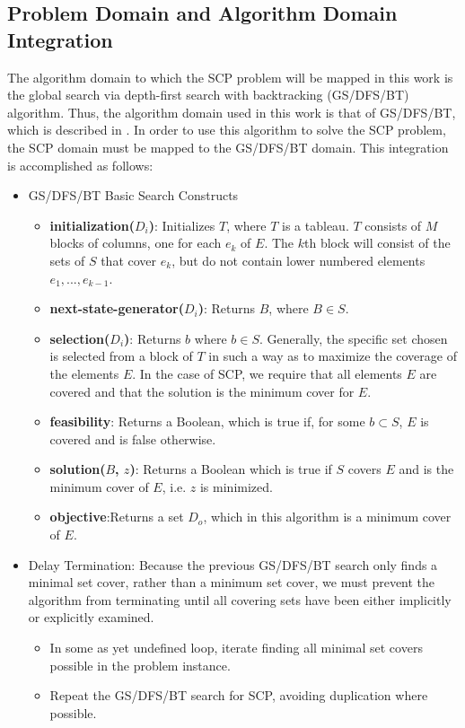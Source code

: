 \documentclass[12pt]{article}
\begin{document}
\subsection{Problem Domain and Algorithm Domain Integration}

The algorithm domain to which the SCP problem will be mapped in this work is the global search via depth-first search with backtracking (GS/DFS/BT) algorithm. Thus, the algorithm domain used in this work is that of GS/DFS/BT, which is described in \cite{ClassNotes686}. In order to use this algorithm to solve the SCP problem, the SCP domain must be mapped to the GS/DFS/BT domain. This integration is accomplished as follows:

\begin{itemize}
	\item GS/DFS/BT Basic Search Constructs
	\begin{itemize}
		\item \textbf{initialization($D_i$)}: Initializes $T$, where $T$ is a tableau. $T$ consists of $M$ blocks of columns, one for each $e_k$ of $E$. The $k$th block will consist of the sets of $S$ that cover $e_k$, but do not contain lower numbered elements $e_1,...,e_{k-1}$.	
		\item \textbf{next-state-generator($D_i$)}: Returns $B$, where $B \in S$.
		\item \textbf{selection($D_i$)}: Returns $b$ where $b \in S$. Generally, the specific set chosen is selected from a block of $T$ in such a way as to maximize the coverage of the elements $E$. In the case of SCP, we require that all elements $E$ are covered and that the solution is the minimum cover for $E$.
		\item \textbf{feasibility}: Returns a Boolean, which is true if, for some $b \subset S$, $E$ is covered and is false otherwise.
		\item \textbf{solution($B$, $z$)}: Returns a Boolean which is true if $S$ covers $E$ and is the minimum cover of $E$, i.e. $z$ is minimized.
		\item \textbf{objective}:Returns a set $D_o$, which in this algorithm is a minimum cover of $E$.
	\end{itemize}
	\item Delay Termination: Because the previous GS/DFS/BT search only finds a minimal set cover, rather than a minimum set cover, we must prevent the algorithm from terminating until all covering sets have been either implicitly or explicitly examined.
	\begin{itemize}
		\item In some as yet undefined loop, iterate finding all minimal set covers possible in the problem instance.
		\item Repeat the GS/DFS/BT search for SCP, avoiding duplication where possible.
	\end{itemize}
\end{itemize}
\end{document}
